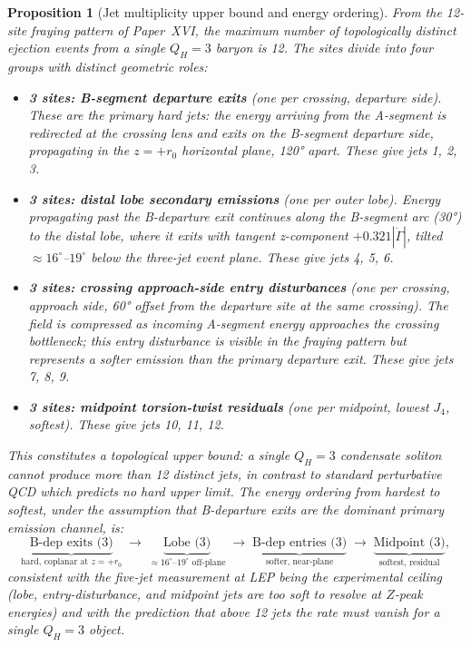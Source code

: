 \documentclass[11pt,a4paper]{article}
\newtheorem{proposition}[theorem]{Proposition}
\theoremstyle{definition}\newtheorem{definition}[theorem]{Definition}
\theoremstyle{remark}
\newcommand{\QH}{Q_H}
\begin{document}
\begin{proposition}[Jet multiplicity upper bound and energy ordering]
\label{P18:prop:jet_bound}
From the 12-site fraying pattern of Paper~XVI, the maximum number
of topologically distinct ejection events from a single $\QH=3$
baryon is 12.  The sites divide into four groups with distinct
geometric roles:
\begin{itemize}[noitemsep]
\item \textbf{3 sites: B-segment departure exits} (one per crossing,
  departure side).  These are the primary hard jets: the energy
  arriving from the A-segment is redirected at the crossing lens and
  exits on the B-segment departure side, propagating in the
  $z=+r_0$ horizontal plane, 120° apart.  These give jets 1, 2, 3.
\item \textbf{3 sites: distal lobe secondary emissions} (one per
  outer lobe). Energy propagating past the B-departure exit continues
  along the B-segment arc (30°) to the distal lobe, where it exits
  with tangent z-component $+0.321|\dot\Gamma|$, tilted
  $\approx16^\circ$--$19^\circ$ below the three-jet event plane.
  These give jets 4, 5, 6.
\item \textbf{3 sites: crossing approach-side entry disturbances}
  (one per crossing, approach side, 60° offset from the departure
  site at the same crossing).  The field is compressed as incoming
  A-segment energy approaches the crossing bottleneck; this entry
  disturbance is visible in the fraying pattern but represents a
  softer emission than the primary departure exit.
  These give jets 7, 8, 9.
\item \textbf{3 sites: midpoint torsion-twist residuals}
  (one per midpoint, lowest $J_4$, softest).
  These give jets 10, 11, 12.
\end{itemize}
This constitutes a topological upper bound: a single $\QH=3$
condensate soliton cannot produce more than 12 distinct jets,
in contrast to standard perturbative QCD which predicts no hard
upper limit.
The energy ordering from hardest to softest, under the assumption
that B-departure exits are the dominant primary emission channel,
is:
\begin{equation}
  \underbrace{\text{B-dep exits (3)}}_{\text{hard, coplanar at }z=+r_0}
  \;\to\;
  \underbrace{\text{Lobe (3)}}_{\approx16^\circ\text{--}19^\circ\text{ off-plane}}
  \;\to\;
  \underbrace{\text{B-dep entries (3)}}_{\text{softer, near-plane}}
  \;\to\;
  \underbrace{\text{Midpoint (3)}}_{\text{softest, residual}},
  \label{P18:eq:jet_ordering}
\end{equation}
consistent with the five-jet measurement at LEP being the
experimental ceiling (lobe, entry-disturbance, and midpoint jets
are too soft to resolve at $Z$-peak energies) and with the
prediction that above 12 jets the rate must vanish for a single
$\QH=3$ object.


\end{proposition}
\end{document}
